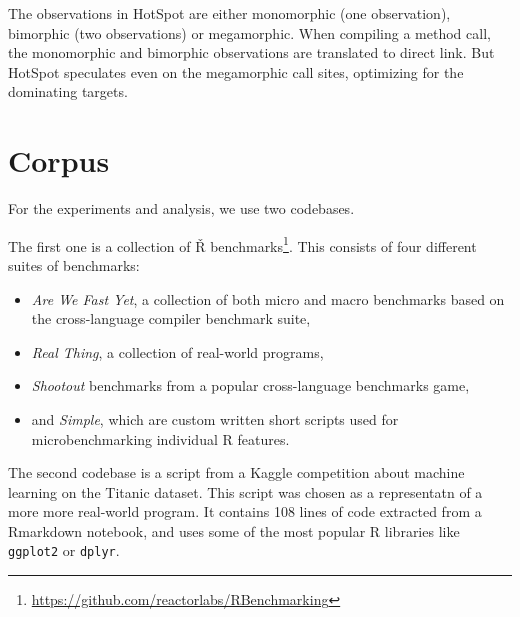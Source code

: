 The observations in HotSpot are either monomorphic (one observation), bimorphic (two observations) or megamorphic. When compiling a method call, the monomorphic and bimorphic observations are translated to direct link. But HotSpot speculates even on the megamorphic call sites, optimizing for the dominating targets.\cite{hotspotWinterhalter}

\section{Corpus}\label{ch:1-corpus}

For the experiments and analysis, we use two codebases.

The first one is a collection of Ř benchmarks\footnote{\url{https://github.com/reactorlabs/RBenchmarking}}. This consists of four different suites of benchmarks:
\begin{itemize}
	\item{} \textit{Are We Fast Yet}, a collection of both micro and macro benchmarks based on the cross-language compiler benchmark suite\cite{are-we-fast-yet},
	\item{} \textit{Real Thing}, a collection of real-world programs,
	\item{} \textit{Shootout} benchmarks from a popular cross-language benchmarks game\cite{shootout},
	\item{} and \textit{Simple}, which are custom written short scripts used for microbenchmarking individual R features.
\end{itemize}

The second codebase is a script from a Kaggle competition about machine learning on the Titanic dataset\cite{titanic}. This script was chosen as a representatn of a more more real-world program. It contains 108 lines of code extracted from a Rmarkdown notebook, and uses some of the most popular R libraries like \texttt{ggplot2} or \texttt{dplyr}.

